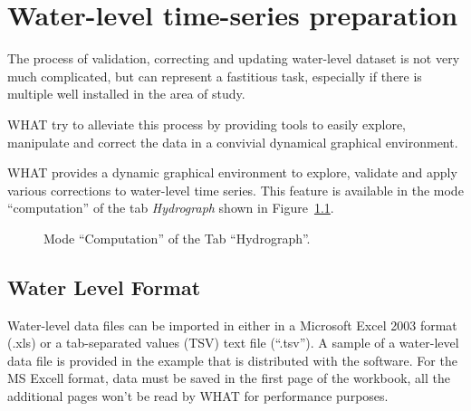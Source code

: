 \documentclass[WHATMANUAL.tex]{subfiles}
\begin{document}
\chapter{Water-level time-series preparation}\label{chap:wlvl_formatting}

The process of validation, correcting and updating water-level dataset is not very much complicated, but can represent a fastitious task, especially if there is multiple well installed in the area of study.

WHAT try to alleviate this process by providing tools to easily explore, manipulate and correct the data in a convivial dynamical graphical environment.

WHAT provides a dynamic graphical environment to explore, validate and apply various corrections to water-level time series. This feature is available in the mode ``computation'' of the tab \emph{Hydrograph} shown in Figure~\ref{fig:tab_hydrograph_computation}.

\begin{figure}[h!]
	\centering
	\setlength{\fboxsep}{0pt}
	\caption[Mode ``Computation'' of the Tab ``Hydrograph''.]{Mode ``Computation'' of the Tab ``Hydrograph''.}
	\label{fig:tab_hydrograph_computation}
\end{figure}

\section{Water Level Format}

Water-level data files can be imported in either in a Microsoft Excel 2003 format (.xls) or a tab-separated values (TSV) text file (``.tsv''). A sample of a water-level data file is provided in the example that is distributed with the software. For the MS Excell format, data must be saved in the first page of the workbook, all the additional pages won't be read by WHAT for performance purposes.
\end{document}
